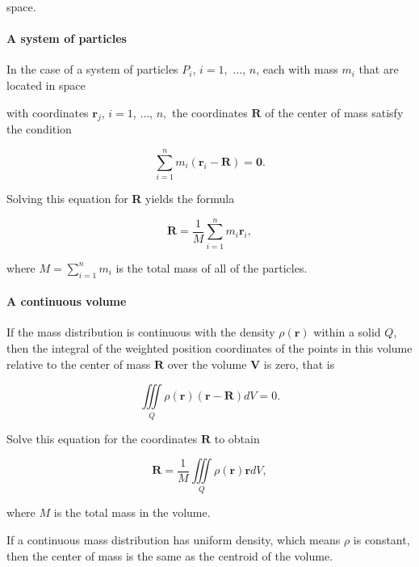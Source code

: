 space.



\paragraph{A system of particles}



In the case of a system of particles $P _i$, $i=1,$ $\dots$, $n$, each with mass $m _i$ that are located in space

with coordinates $\mathbf{r} _j$, $i=1$, $\dots$, $n,$ the coordinates $\mathbf{R}$ of the center of mass satisfy the condition



$$\sum _{i=1}^n m _i(\mathbf{r} _i - \mathbf{R}) = \mathbf{0}.$$



Solving this equation for \textbf{R} yields the formula



$$\mathbf{R} = \frac 1M \sum _{i=1}^n m _i \mathbf{r} _i,$$



where $M = \sum _{i = 1}^n m _i$ is the total mass of all of the particles.



\paragraph{A continuous volume}



If the mass distribution is continuous with the density $\rho(\mathbf{r})$ within a solid $Q$, then the integral of the weighted position coordinates of the points in this volume relative to the center of mass $\mathbf{R}$ over the volume $\mathbf{V}$ is zero, that is



$$\iiint\limits _{Q} \rho(\mathbf{r})(\mathbf{r}-\mathbf{R})dV = 0.$$



Solve this equation for the coordinates $\mathbf{R}$ to obtain



$$\mathbf R = \frac 1M \iiint\limits _{Q}\rho(\mathbf{r}) \mathbf{r} dV,$$

where $M$ is the total mass in the volume.



If a continuous mass distribution has uniform density, which means $\rho$ is constant, then the center of mass is the same as the centroid of the volume.



